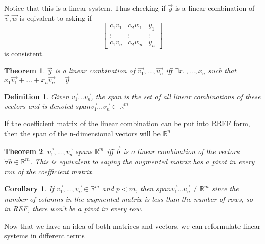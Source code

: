 \documentclass{article}
\newtheorem{theorem}{Theorem}
\newtheorem{definition}{Definition}
\newtheorem{corollary}{Corollary}
\begin{document}
    Notice that this is a linear system. Thus checking if $\vec{y}$ is a linear combination of $\vec{v}, \vec{w}$ is eqivalent to asking if
    \[
        \left[
            \begin{array}{cc|c}
                c_1 v_1 & c_2 w_1 & y_1\\
                \vdots & \vdots & \vdots\\
                c_1 v_n & c_2 w_n & y_n
            \end{array}
        \right]
        \] is consistent.
        \begin{theorem}
            $\vec{y}$ is a linear combination of $\vec{v_1},...,\vec{v_n}$ iff $\exists x_1,...,x_n$ such that $x_1\vec{v_1}+...+x_n\vec{v_n}=\vec{y}$
        \end{theorem}
        \begin{definition}
            Given $\vec{v_1}...\vec{v_n}$, the span is the set of all linear combinations of these vectors and is denoted $span{\vec{v_1}...\vec{v_n}}\subset \mathbb{R}^m$
        \end{definition}
        If the coefficient matrix of the linear combination can be put into RREF form, then the span of the n-dimensional vectors will be $\mathbb{R}^n$
        \begin{theorem}
            \label{Equivalence Theorem}
            $\vec{v_1},...,\vec{v_n}$ spans $\mathbb{R}^m$ iff $\vec{b}$ is a linear combination of the vectors $\forall b \in \mathbb{R}^m$.
            This is equivalent to saying the augmented matrix has a pivot in every row of the coefficient matrix.
        \end{theorem}
        \begin{corollary}
            If $\vec{v_1},...,\vec{v_p} \in \mathbb{R}^m$ and $p<m$, then $span{\vec{v_1}...\vec{v_n}} \ne \mathbb{R}^m$ 
            since the number of columns in the augmented matrix is less than the number of rows, so in REF, there won't be a pivot in every row.
        \end{corollary}
        Now that we have an idea of both matrices and vectors, we can reformulate linear systems in different terms
\end{document}
